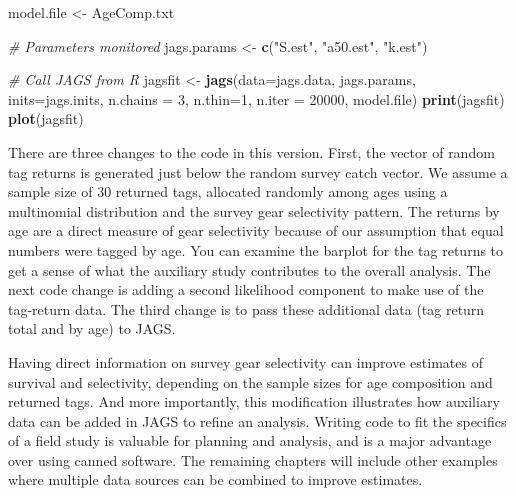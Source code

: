 \documentclass[
]{krantz}
\makeatletter
\newenvironment{Shaded}{\begin{snugshade}}{\end{snugshade}}
\newcommand{\AttributeTok}[1]{\textcolor[rgb]{0.27,0.27,0.27}{#1}}
\newcommand{\CommentTok}[1]{\textcolor[rgb]{0.37,0.37,0.37}{\textit{#1}}}
\newcommand{\DecValTok}[1]{\textcolor[rgb]{0.06,0.06,0.06}{#1}}
\newcommand{\FunctionTok}[1]{\textcolor[rgb]{0.27,0.27,0.27}{\textbf{#1}}}
\newcommand{\NormalTok}[1]{#1}
\newcommand{\OtherTok}[1]{\textcolor[rgb]{0.37,0.37,0.37}{#1}}
\newcommand{\StringTok}[1]{\textcolor[rgb]{0.5,0.5,0.5}{#1}}
\newenvironment{kframe}{%
\medskip{}
\setlength{\fboxsep}{.8em}
 \def\at@end@of@kframe{}%
 \ifinner\ifhmode%
  \def\at@end@of@kframe{\end{minipage}}%
  \begin{minipage}{\columnwidth}%
 \fi\fi%
 \def\FrameCommand##1{\hskip\@totalleftmargin \hskip-\fboxsep
 \colorbox{shadecolor}{##1}\hskip-\fboxsep
     \hskip-\linewidth \hskip-\@totalleftmargin \hskip\columnwidth}%
 \MakeFramed {\advance\hsize-\width
   \@totalleftmargin\z@ \linewidth\hsize
   \@setminipage}}%
 {\par\unskip\endMakeFramed%
 \at@end@of@kframe}
\renewenvironment{Shaded}{\begin{kframe}}{\end{kframe}}
\makeatother
\begin{document}
\begin{Shaded}
\begin{Highlighting}[]
\NormalTok{model.file }\OtherTok{\textless{}{-}} \StringTok{\textquotesingle{}AgeComp.txt\textquotesingle{}}

\CommentTok{\# Parameters monitored}
\NormalTok{jags.params }\OtherTok{\textless{}{-}} \FunctionTok{c}\NormalTok{(}\StringTok{"S.est"}\NormalTok{, }\StringTok{"a50.est"}\NormalTok{, }\StringTok{"k.est"}\NormalTok{)}

\CommentTok{\# Call JAGS from R}
\NormalTok{jagsfit }\OtherTok{\textless{}{-}} \FunctionTok{jags}\NormalTok{(}\AttributeTok{data=}\NormalTok{jags.data, jags.params, }\AttributeTok{inits=}\NormalTok{jags.inits,}
                \AttributeTok{n.chains =} \DecValTok{3}\NormalTok{, }\AttributeTok{n.thin=}\DecValTok{1}\NormalTok{, }\AttributeTok{n.iter =} \DecValTok{20000}\NormalTok{,}
\NormalTok{                model.file)}
\FunctionTok{print}\NormalTok{(jagsfit)}
\FunctionTok{plot}\NormalTok{(jagsfit)}
\end{Highlighting}
\end{Shaded}

There are three changes to the code in this version. First, the vector of random tag returns is generated just below the random survey catch vector. We assume a sample size of 30 returned tags, allocated randomly among ages using a multinomial distribution and the survey gear selectivity pattern. The returns by age are a direct measure of gear selectivity because of our assumption that equal numbers were tagged by age. You can examine the barplot for the tag returns to get a sense of what the auxiliary study contributes to the overall analysis. The next code change is adding a second likelihood component to make use of the tag-return data. The third change is to pass these additional data (tag return total and by age) to JAGS.

Having direct information on survey gear selectivity can improve estimates of survival and selectivity, depending on the sample sizes for age composition and returned tags. And more importantly, this modification illustrates how auxiliary data can be added in JAGS to refine an analysis. Writing code to fit the specifics of a field study is valuable for planning and analysis, and is a major advantage over using canned software. The remaining chapters will include other examples where multiple data sources can be combined to improve estimates.
\end{document}
